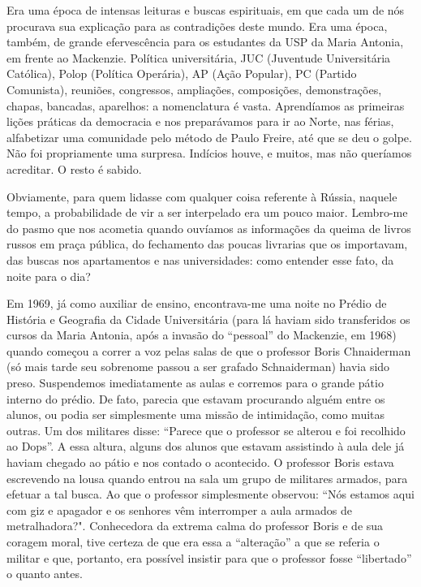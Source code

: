 Era uma época de intensas leituras e buscas espirituais, em que cada um
de nós procurava sua explicação para as contradições deste mundo. Era
uma época, também, de grande efervescência para os estudantes da USP da
Maria Antonia, em frente ao Mackenzie. Política universitária, JUC
(Juventude Universitária Católica), Polop (Política Operária), AP (Ação
Popular), PC (Partido Comunista), reuniões, congressos, ampliações,
composições, demonstrações, chapas, bancadas, aparelhos: a nomenclatura
é vasta. Aprendíamos as primeiras lições práticas da democracia e nos
preparávamos para ir ao Norte, nas férias, alfabetizar uma comunidade
pelo método de Paulo Freire, até que se deu o golpe. Não foi
propriamente uma surpresa. Indícios houve, e muitos, mas não queríamos
acreditar. O resto é sabido.

Obviamente, para quem lidasse com qualquer coisa referente à Rússia,
naquele tempo, a probabilidade de vir a ser interpelado era um pouco
maior. Lembro-me do pasmo que nos acometia quando ouvíamos as
informações da queima de livros russos em praça pública, do fechamento
das poucas livrarias que os importavam, das buscas nos apartamentos e
nas universidades: como entender esse fato, da noite para o dia?

Em 1969, já como auxiliar de ensino, encontrava-me uma noite no Prédio
de História e Geografia da Cidade Universitária (para lá haviam sido
transferidos os cursos da Maria Antonia, após a invasão do ``pessoal''
do Mackenzie, em 1968) quando começou a correr a voz pelas salas de que
o professor Boris Chnaiderman (só mais tarde seu sobrenome passou a ser
grafado Schnaiderman) havia sido preso. Suspendemos imediatamente as
aulas e corremos para o grande pátio interno do prédio. De fato, parecia
que estavam procurando alguém entre os alunos, ou podia ser simplesmente
uma missão de intimidação, como muitas outras. Um dos militares disse:
``Parece que o professor se alterou e foi recolhido ao Dops''. A essa
altura, alguns dos alunos que estavam assistindo à aula dele já haviam
chegado ao pátio e nos contado o acontecido. O professor Boris estava
escrevendo na lousa quando entrou na sala um grupo de militares armados,
para efetuar a tal busca. Ao que o professor simplesmente observou:
``Nós estamos aqui com giz e apagador e os senhores vêm interromper a
aula armados de metralhadora?". Conhecedora da extrema calma do
professor Boris e de sua coragem moral, tive certeza de que era essa a
``alteração'' a que se referia o militar e que, portanto, era possível
insistir para que o professor fosse ``libertado'' o quanto antes.

